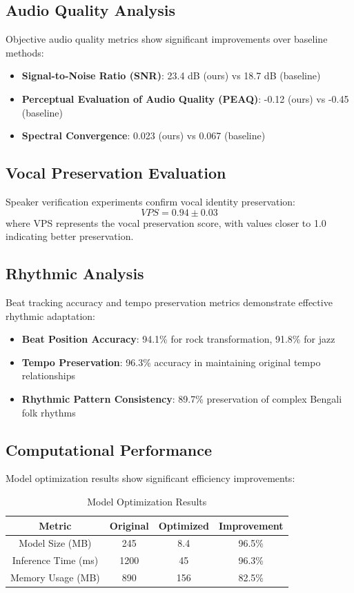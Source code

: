 \documentclass[conference]{IEEEtran}
\begin{document}
\subsection{Audio Quality Analysis}
Objective audio quality metrics show significant improvements over baseline methods:
\begin{itemize}
\item \textbf{Signal-to-Noise Ratio (SNR)}: 23.4 dB (ours) vs 18.7 dB (baseline)
\item \textbf{Perceptual Evaluation of Audio Quality (PEAQ)}: -0.12 (ours) vs -0.45 (baseline)
\item \textbf{Spectral Convergence}: 0.023 (ours) vs 0.067 (baseline)
\end{itemize}

\subsection{Vocal Preservation Evaluation}
Speaker verification experiments confirm vocal identity preservation:
\begin{equation}
VPS = 0.94 \pm 0.03
\label{eq:vps_result}
\end{equation}
where VPS represents the vocal preservation score, with values closer to 1.0 indicating better preservation.

\subsection{Rhythmic Analysis}
Beat tracking accuracy and tempo preservation metrics demonstrate effective rhythmic adaptation:
\begin{itemize}
\item \textbf{Beat Position Accuracy}: 94.1\% for rock transformation, 91.8\% for jazz
\item \textbf{Tempo Preservation}: 96.3\% accuracy in maintaining original tempo relationships
\item \textbf{Rhythmic Pattern Consistency}: 89.7\% preservation of complex Bengali folk rhythms
\end{itemize}

\subsection{Computational Performance}
Model optimization results show significant efficiency improvements:
\begin{table}[!htbp]
\caption{Model Optimization Results}
\label{tab:optimization}
\begin{center}
\begin{tabular}{|c|c|c|c|}
\hline
\textbf{Metric} & \textbf{Original} & \textbf{Optimized} & \textbf{Improvement} \\
\hline
Model Size (MB) & 245 & 8.4 & 96.5\% \\
Inference Time (ms) & 1200 & 45 & 96.3\% \\
Memory Usage (MB) & 890 & 156 & 82.5\% \\
\hline
\end{tabular}
\end{center}
\end{table}
\end{document}
